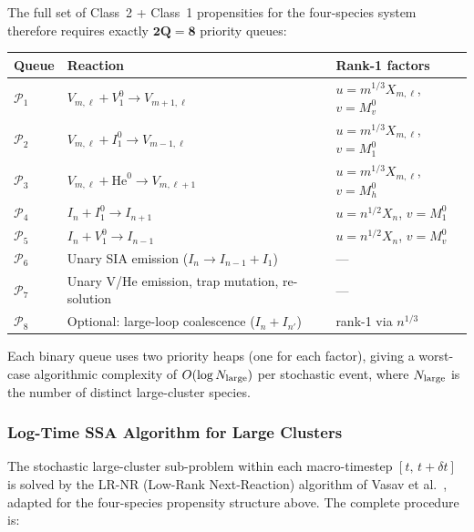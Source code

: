 The full set of Class~2 + Class~1 propensities for the
four-species system therefore requires exactly $\mathbf{2Q = 8}$
priority queues:
\begin{table}[h]
\centering\label{eq:queue_classes}
\renewcommand{\arraystretch}{1.2}
\begin{tabular}{@{}lll@{}}
\toprule
\textbf{Queue} & \textbf{Reaction} & \textbf{Rank-1 factors} \\
\midrule
$\mathcal{P}_1$ & $V_{m,\ell} + V_1^0 \to V_{m+1,\ell}$ &
  $u = m^{1/3}X_{m,\ell}$,\; $v = M_v^0$ \\
$\mathcal{P}_2$ & $V_{m,\ell} + I_1^0 \to V_{m-1,\ell}$ &
  $u = m^{1/3}X_{m,\ell}$,\; $v = M_1^0$ \\
$\mathcal{P}_3$ & $V_{m,\ell} + \mathrm{He}^0 \to V_{m,\ell+1}$ &
  $u = m^{1/3}X_{m,\ell}$,\; $v = M_h^0$ \\
$\mathcal{P}_4$ & $I_n + I_1^0 \to I_{n+1}$ &
  $u = n^{1/2}X_n$,\; $v = M_1^0$ \\
$\mathcal{P}_5$ & $I_n + V_1^0 \to I_{n-1}$ &
  $u = n^{1/2}X_n$,\; $v = M_v^0$ \\
$\mathcal{P}_6$ & Unary SIA emission ($I_n \to I_{n-1}+I_1$) & --- \\
$\mathcal{P}_7$ & Unary V/He emission, trap mutation, re-solution & --- \\
$\mathcal{P}_8$ & Optional: large-loop coalescence ($I_n+I_{n'}$) &
  rank-1 via $n^{1/3}$ \\
\bottomrule
\end{tabular}
\end{table}
Each binary queue uses two priority heaps (one for each factor),
giving a worst-case algorithmic complexity of
$O(\log N_{\rm large})$ per stochastic event, where $N_{\rm large}$
is the number of distinct large-cluster species.

\subsubsection{Log-Time SSA Algorithm for Large Clusters}
\label{sec:hybrid_logSSA}

The stochastic large-cluster sub-problem within each macro-timestep
$[t,\,t+\delta t]$ is solved by the LR-NR (Low-Rank Next-Reaction)
algorithm of Vasav et al.~\cite{Vasav2026}, adapted for the
four-species propensity structure above.  The complete procedure
is:

